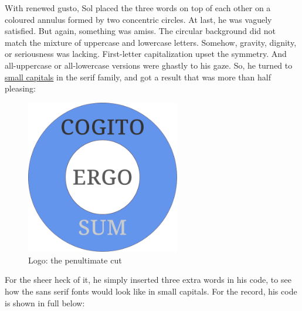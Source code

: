 \documentclass[
  a4paper,
]{article}
\begin{document}
With renewed gusto, Sol placed the three words on top of each other on a
coloured annulus formed by two concentric circles. At last, he was
vaguely satisfied. But again, something was amiss. The circular
background did not match the mixture of uppercase and lowercase letters.
Somehow, gravity, dignity, or seriousness was lacking. First-letter
capitalization upset the symmetry. And all-uppercase or all-lowercase
versions were ghastly to his gaze. So, he turned to
\href{https://en.wikipedia.org/wiki/Small_caps}{small capitals} in the
serif family, and got a result that was more than half pleasing:

\begin{figure}
\centering
\includegraphics[width=0.6\textwidth,height=\textheight]{images/penultimatecut.svg}
\caption{Logo: the penultimate cut}
\end{figure}

For the sheer heck of it, he simply inserted three extra words in his
code, to see how the sans serif fonts would look like in small capitals.
For the record, his code is shown in full below:
\end{document}
